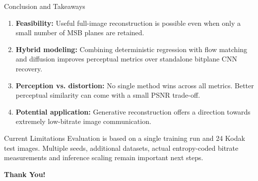 \documentclass[aspectratio=169, 11pt]{beamer}
\begin{document}
\begin{frame}{Conclusion and Takeaways}
    \begin{enumerate}
        \item \textbf{Feasibility:} Useful full-image reconstruction is possible even when only a small number of MSB planes are retained.

        \vspace{0.2cm}
        \item \textbf{Hybrid modeling:} Combining deterministic regression with flow matching and diffusion improves perceptual metrics over standalone bitplane CNN recovery.

        \vspace{0.2cm}
        \item \textbf{Perception vs. distortion:} No single method wins across all metrics. Better perceptual similarity can come with a small PSNR trade-off.

        \vspace{0.2cm}
        \item \textbf{Potential application:} Generative reconstruction offers a direction towards extremely low-bitrate image communication.
    \end{enumerate}

    \vspace{0.35cm}
    \begin{block}{Current Limitations}
        Evaluation is based on a single training run and 24 Kodak test images. Multiple seeds, additional datasets, actual entropy-coded bitrate measurements and inference scaling remain important next steps.
    \end{block}

    \vspace{0.2cm}
    \begin{center}
        \Large\bfseries Thank You!
    \end{center}

\end{frame}
\end{document}
